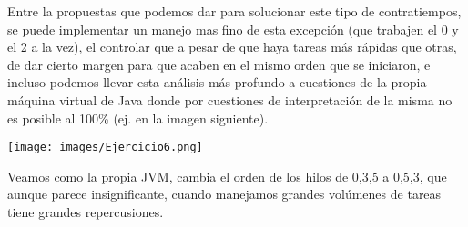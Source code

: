 \begin{enumerate}
\begin{itemize}
    Entre la propuestas que podemos dar para solucionar este tipo de contratiempos, se puede implementar un manejo mas fino de esta excepción (que trabajen el 0 y el 2 a la vez), el controlar que a pesar de que haya tareas más rápidas que otras, de dar cierto margen para que acaben en el mismo orden que se iniciaron, e incluso podemos llevar esta análisis más profundo a cuestiones de la propia máquina virtual de Java donde por cuestiones de interpretación de la misma no es posible al 100\% (ej. en la imagen siguiente).

    \begin{center}
            \texttt{[image: images/Ejercicio6.png]}
    \end{center}

    Veamos como la propia JVM, cambia el orden de los hilos de 0,3,5 a 0,5,3, que aunque parece insignificante, cuando manejamos grandes volúmenes de tareas tiene grandes repercusiones.
  
\end{itemize}
    
\end{enumerate}
